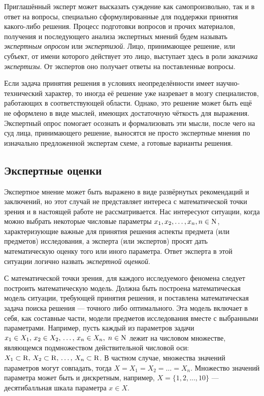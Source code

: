 Приглашённый эксперт может высказать суждение как самопроизвольно, так и в ответ на вопросы, специально сформулированные для поддержки принятия какого-либо решения. Процесс подготовки вопросов и прочих материалов, получения и последующего анализа экспертных мнений будем называть {\sl экспертным опросом} или {\sl экспертизой}. Лицо, принимающее решение, или субъект, от имени которого действует это лицо, выступает здесь в роли {\sl заказчика экспертизы}. От экспертов оно получает ответы на поставленные вопросы.
 
Если задача принятия решения в условиях неопределённости имеет научно-технический характер, то иногда её решение уже назревает в мозгу специалистов, работающих в соответствующей области. Однако, это решение может быть ещё не оформлено в виде мыслей, имеющих достаточную чёткость для выражения. Экспертный опрос помогает осознать и формализовать эти мысли, после чего на суд лица, принимающего решение, выносятся не просто экспертные мнения по изначально предложенной экспертам схеме, а готовые варианты решения. 

\subsection{Экспертные оценки}

Экспертное мнение может быть выражено в виде развёрнутых рекомендаций и заключений, но этот случай не представляет интереса с математической точки зрения и в настоящей работе не рассматривается. Нас интересуют ситуации, когда можно выбрать некоторые числовые параметры $x_1, x_2, \ldots, x_n, n \in {\mathrm{N}}$, характеризующие важные для принятия решения аспекты предмета (или предметов) исследования, а эксперта (или экспертов) просят дать математическую оценку того или иного параметра. Ответ эксперта в этой ситуации логично назвать {\sl экспертной оценкой}. 

С математической точки зрения, для каждого исследуемого феномена следует построить математическую модель. Должна быть построена математическая модель ситуации, требующей принятия решения, и поставлена математическая задача поиска решения --- точного либо оптимального. Эта модель включает в себя, как составные части, модели предметов исследования вместе с выбранными параметрами. Например, пусть каждый из параметров задачи $x_1 \in X_1,\, x_2 \in X_2,\, \ldots,\, x_n \in X_n,\; n \in {\mathrm{N}}$ лежит на числовом множестве, являющемся подмножеством действительной числовой оси: $X_1 \subset {\mathrm{R}},\, X_2 \subset {\mathrm{R}},\, \ldots,\, X_n \subset {\mathrm{R}}$. В частном случае, множества значений параметров могут совпадать, тогда $X = X_1 = X_2 = \ldots = X_n$. Множество значений параметра может быть и дискретным, например, $X = \{1, 2, ..., 10\}$ --- десятибалльная шкала параметра $x \in X$.


